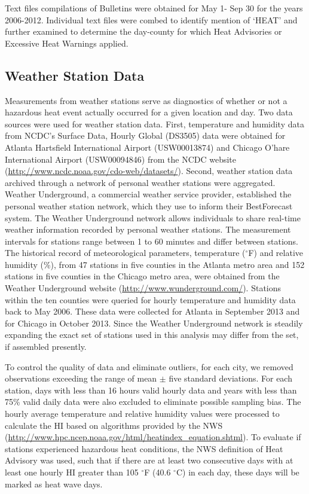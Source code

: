 \documentclass{ametsoc}
\begin{document}
Text files compilations of Bulletins were obtained for May 1- Sep 30 for the years 2006-2012. Individual text files were combed to identify mention of `HEAT' and further examined to determine the day-county for which Heat Advisories or Excessive Heat Warnings applied. 

\subsection{Weather Station Data}\label{subsec:WUNDERdata}
Measurements from weather stations serve as diagnostics of whether or not a hazardous heat event actually occurred for a given location and day. Two data sources were used for weather station data. First, temperature and humidity data from NCDC's Surface Data, Hourly Global (DS3505) data were obtained for Atlanta Hartsfield International Airport (USW00013874) and Chicago O'hare International Airport (USW00094846) from the NCDC website (\url{http://www.ncdc.noaa.gov/cdo-web/datasets/}). Second, weather station data archived through a network of personal weather stations were aggregated. Weather Underground, a commercial weather service provider, established the personal weather station network, which they use to inform their BestForecast\textsuperscript{\textregistered} system. The Weather Underground network allows individuals to share real-time weather information recorded by personal weather stations. The measurement intervals for stations range between 1 to 60 minutes and differ between stations. The historical record of meteorological parameters, temperature ($^{\circ}$F) and relative humidity (\%), from 47 stations in five counties in the Atlanta metro area and 152 stations in five counties in the Chicago metro area, were obtained from the Weather Underground website (\url{http://www.wunderground.com/}). Stations within the ten counties were queried for hourly temperature and humidity data back to May 2006. These data were collected for Atlanta in September 2013 and for Chicago in October 2013. Since the Weather Underground network is steadily expanding the exact set of stations used in this analysis may differ from the set, if assembled presently. 

To control the quality of data and eliminate outliers, for each city, we removed observations exceeding the range of mean $\pm$ five standard deviations. For each station, days with less than 16 hours valid hourly data and years with less than 75\% valid daily data were also excluded to eliminate possible sampling bias. The hourly average temperature and relative humidity values were processed to calculate the HI based on algorithms provided by the NWS (\url{http://www.hpc.ncep.noaa.gov/html/heatindex_equation.shtml}). To evaluate if stations experienced hazardous heat conditions, the NWS definition of Heat Advisory was used, such that if there are at least two consecutive days with at least one hourly HI greater than 105 $^{\circ}$F (40.6 $^{\circ}$C) in each day, these days will be marked as heat wave days.
\end{document}
